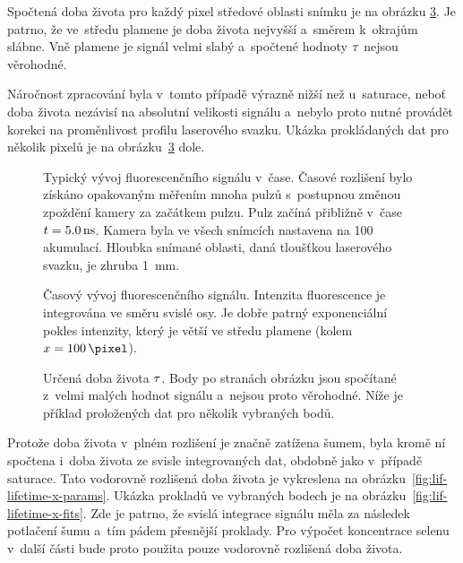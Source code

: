 Spočtená doba života pro každý pixel středové oblasti snímku je
na obrázku \ref{fig:lif-lifetime-full-params}.
Je patrno, že ve~středu plamene je doba života nejvyšší
a~směrem k~okrajům slábne.
Vně plamene je signál velmi slabý a~spočtené hodnoty $\tau$
nejsou věrohodné.

Náročnost zpracování byla v~tomto případě výrazně nižší než u~saturace,
neboť doba života nezávisí na absolutní velikosti signálu
a~nebylo proto nutné provádět korekci na proměnlivost profilu
laserového svazku.
Ukázka prokládaných dat pro několik pixelů je
na obrázku~\ref{fig:lif-lifetime-full-params} dole.

\begin{figure}[p]
	\centering
	
	\caption{Typický vývoj fluorescenčního signálu v~čase.
		Časové rozlišení bylo získáno opakovaným měřením mnoha pulzů
		s~postupnou změnou zpoždění kamery za začátkem pulzu.
		Pulz začíná přibližně v~čase $t = \SI{5.0}{\nano\second}$.
		Kamera byla ve všech snímcích nastavena na \num{100} akumulací.
		Hloubka snímané oblasti, daná tloušťkou laserového svazku,
		je zhruba \SI{1}{\milli\metre}.}
	\label{fig:lif-timeev}
\end{figure}

\begin{figure}[htp]
	\centering
	
	\caption{Časový vývoj fluorescenčního signálu.
		Intenzita fluorescence je integrována ve směru svislé osy.
		Je dobře patrný exponenciální pokles intenzity,
		který je větší ve středu plamene (kolem $\xpos = \SI{100}{\pixel}$).}
	\label{fig:lif-lifetime-x-time}
\end{figure}

\begin{figure}[htp]
	\centering
	
	
	\caption{Určená doba života $\tau$.
		Body po stranách obrázku jsou spočítané z~velmi malých hodnot
		signálu a~nejsou proto věrohodné.
		Níže je příklad proložených dat pro několik vybraných bodů.}
	\label{fig:lif-lifetime-full-params}
\end{figure}

Protože doba života v~plném rozlišení je značně zatížena šumem,
byla kromě ní spočtena i~doba života ze svisle integrovaných dat,
obdobně jako v~případě saturace.
Tato vodorovně rozlišená doba života je vykreslena
na obrázku~\ref{fig:lif-lifetime-x-params}.
Ukázka prokladů ve vybraných bodech je
na obrázku~\ref{fig:lif-lifetime-x-fits}.
Zde je patrno, že svislá integrace signálu měla za následek potlačení šumu
a~tím pádem přesnější proklady.
Pro výpočet koncentrace selenu v~další části bude proto použita pouze
vodorovně rozlišená doba života.

